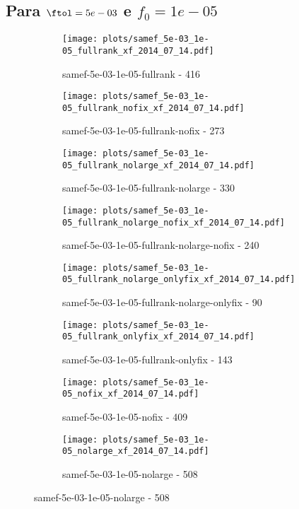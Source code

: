 \newpage
\subsection{Para $\ftol = 5e-03$ e $f_0 = 1e-05$}

\begin{figure}[H]
  \centering
  \begin{subfigure}{0.48\textwidth}
    \texttt{[image: plots/samef\_5e-03\_1e-05\_fullrank\_xf\_2014\_07\_14.pdf]}
    \caption{samef-5e-03-1e-05-fullrank - 416}
  \end{subfigure}
  \begin{subfigure}{0.48\textwidth}
    \texttt{[image: plots/samef\_5e-03\_1e-05\_fullrank\_nofix\_xf\_2014\_07\_14.pdf]}
    \caption{samef-5e-03-1e-05-fullrank-nofix - 273}
  \end{subfigure}
  \begin{subfigure}{0.48\textwidth}
    \texttt{[image: plots/samef\_5e-03\_1e-05\_fullrank\_nolarge\_xf\_2014\_07\_14.pdf]}
    \caption{samef-5e-03-1e-05-fullrank-nolarge - 330}
  \end{subfigure}
  \begin{subfigure}{0.48\textwidth}
    \texttt{[image: plots/samef\_5e-03\_1e-05\_fullrank\_nolarge\_nofix\_xf\_2014\_07\_14.pdf]}
    \caption{samef-5e-03-1e-05-fullrank-nolarge-nofix - 240}
  \end{subfigure}
  \begin{subfigure}{0.48\textwidth}
    \texttt{[image: plots/samef\_5e-03\_1e-05\_fullrank\_nolarge\_onlyfix\_xf\_2014\_07\_14.pdf]}
    \caption{samef-5e-03-1e-05-fullrank-nolarge-onlyfix - 90}
  \end{subfigure}
  \begin{subfigure}{0.48\textwidth}
    \texttt{[image: plots/samef\_5e-03\_1e-05\_fullrank\_onlyfix\_xf\_2014\_07\_14.pdf]}
    \caption{samef-5e-03-1e-05-fullrank-onlyfix - 143}
  \end{subfigure}
  \begin{subfigure}{0.48\textwidth}
    \texttt{[image: plots/samef\_5e-03\_1e-05\_nofix\_xf\_2014\_07\_14.pdf]}
    \caption{samef-5e-03-1e-05-nofix - 409}
  \end{subfigure}
  \begin{subfigure}{0.48\textwidth}
    \texttt{[image: plots/samef\_5e-03\_1e-05\_nolarge\_xf\_2014\_07\_14.pdf]}
    \caption{samef-5e-03-1e-05-nolarge - 508}
  \end{subfigure}

\end{figure}
